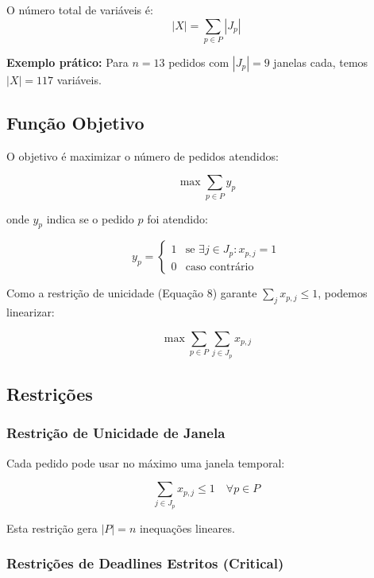 \documentclass[11pt,a4paper]{article}
\begin{document}
O número total de variáveis é:
\begin{equation}
|X| = \sum_{p \in P} |J_p|
\end{equation}

\textbf{Exemplo prático:} Para $n = 13$ pedidos com $|J_p| = 9$ janelas cada, temos $|X| = 117$ variáveis.

\subsection{Função Objetivo}

O objetivo é maximizar o número de pedidos atendidos:

\begin{equation}
\max \sum_{p \in P} y_p
\end{equation}

onde $y_p$ indica se o pedido $p$ foi atendido:

\begin{equation}
y_p = \begin{cases}
1 & \text{se } \exists j \in J_p : x_{p,j} = 1 \\
0 & \text{caso contrário}
\end{cases}
\end{equation}

Como a restrição de unicidade (Equação 8) garante $\sum_j x_{p,j} \leq 1$, podemos linearizar:

\begin{equation}
\max \sum_{p \in P} \sum_{j \in J_p} x_{p,j}
\end{equation}

\subsection{Restrições}

\subsubsection{Restrição de Unicidade de Janela}

Cada pedido pode usar no máximo uma janela temporal:

\begin{equation}
\sum_{j \in J_p} x_{p,j} \leq 1 \quad \forall p \in P
\end{equation}

Esta restrição gera $|P| = n$ inequações lineares.

\subsubsection{Restrições de Deadlines Estritos (Critical)}
\end{document}
